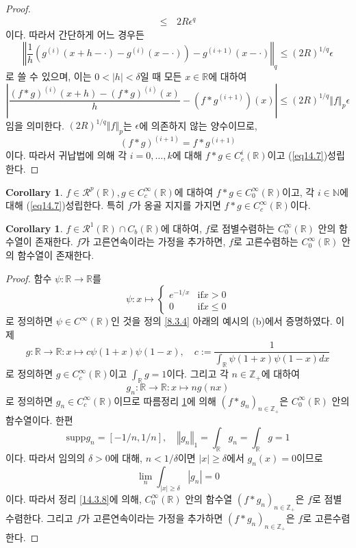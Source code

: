\documentclass[11pt]{book}
\numberwithin{equation}{chapter}
\def\NN{\mathbb{N}}
\def\ZZ{\mathbb{Z}}
\def\RR{\mathbb{R}}
\def\eps{\epsilon}
\def\calR{\mathcal{R}}
\newcommand{\abs}[1]{\left\vert#1\right\vert}
\newcommand{\norm}[1]{\left\Vert#1\right\Vert}
\def\textif{\text{if}}
\theoremstyle{definition}
\newtheorem{cor}[thm]{Corollary}
\begin{document}
\begin{proof}
\begin{align*}
        \le\,& 2R\eps^q
    \end{align*}
    이다. 따라서 간단하게 어느 경우든
    \[
        \norm{\frac{1}{h}(g^{(i)}(x+h-\cdot) - g^{(i)}(x-\cdot)) - g^{(i+1)}(x-\cdot)}_{q} \le (2R)^{1/q} \eps
    \]
    로 쓸 수 있으며, 이는 \(0 < \abs{h} < \delta\)일 때 모든 \(x \in \RR\)에 대하여
    \[
        \abs{\frac{(f*g)^{(i)}(x+h) - (f*g)^{(i)}(x)}{h} - (f * g^{(i+1)})(x)} \le (2R)^{1/q} \norm{f}_p \eps
    \]
    임을 의미한다. \((2R)^{1/q} \norm{f}_p\)는 \(\eps\)에 의존하지 않는 양수이므로,
    \[
        (f*g)^{(i+1)} = f * g^{(i+1)}
    \]
    이다. 따라서 귀납법에 의해 각 \(i = 0, \ldots, k\)에 대해 \(f*g \in C_c^i(\RR)\)이고 (\ref{eq14.7})\이 성립한다.
\end{proof}

\begin{cor} \label{14.3.10}
    \(f \in \calR^p(\RR), g \in C_c^\infty(\RR)\)에 대하여 \(f * g \in C_0^\infty(\RR)\)이고, 각 \(i \in \NN\)에 대해 (\ref{eq14.7})\이 성립한다. 특히 \(f\)가 옹골 지지를 가지면 \(f * g \in C_c^\infty(\RR)\)이다.
\end{cor}

\begin{cor}
    \(f \in \calR^1(\RR) \cap C_b(\RR)\)에 대하여, \(f\)로 점별수렴하는 \(C_0^\infty(\RR)\) 안의 함수열이 존재한다. \(f\)가 고른연속이라는 가정을 추가하면, \(f\)로 고른수렴하는 \(C_0^\infty(\RR)\) 안의 함수열이 존재한다.
\end{cor}

\begin{proof}
    함수 \(\psi : \RR \to \RR\)를
    \[
        \psi : x \mapsto
        \begin{cases}
            e^{-1/x} &\textif x > 0\\
            0 &\textif x \le 0
        \end{cases}
    \]
    로 정의하면 \(\psi \in C^\infty(\RR)\)인 것을 정의 \ref{8.3.4} 아래의 예시의 (b)에서 증명하였다. 이제
    \[
        g : \RR \to \RR : x \mapsto c\psi(1+x)\psi(1-x), \quad c := \frac{1}{\int_\RR \psi(1+x)\psi(1-x) dx}
    \]
    로 정의하면 \(g \in C_c^\infty(\RR)\)이고 \(\int_\RR g = 1\)이다. 그리고 각 \(n \in \ZZ_+\)에 대하여
    \[
        g_n : \RR \to \RR : x \mapsto n g(nx)
    \]
    로 정의하면 \(g_n \in C_c^\infty(\RR)\)이므로 따름정리 \ref{14.3.10}에 의해 \((f * g_n)_{n \in \ZZ_+}\)은 \(C_0^\infty(\RR)\) 안의 함수열이다. 한편
    \[
    \mathrm{supp} g_n = [-1/n, 1/n], \quad \norm{g_n}_1 = \int_\RR g_n = \int_\RR g = 1
    \]
    이다. 따라서 임의의 \(\delta > 0\)에 대해, \(n < 1/\delta\)이면 \(\abs{x} \ge \delta\)에서 \(g_n(x) = 0\)이므로
    \[
    \lim_{n} \int_{\abs{x} \ge \delta} \abs{g_n} = 0
    \]
    이다. 따라서 정리 \ref{14.3.8}에 의해, \(C_0^\infty(\RR)\) 안의 함수열 \((f * g_n)_{n \in \ZZ_+}\)은 \(f\)로 점별수렴한다. 그리고 \(f\)가 고른연속이라는 가정을 추가하면 \((f * g_n)_{n \in \ZZ_+}\)은 \(f\)로 고른수렴한다.
\end{proof}
\end{document}
